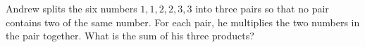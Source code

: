 Andrew splits the six numbers $1, 1, 2, 2, 3, 3$ into three pairs so that no pair contains two of the same number. For each pair, he multiplies the two numbers in the pair together. What is the sum of his three products?
